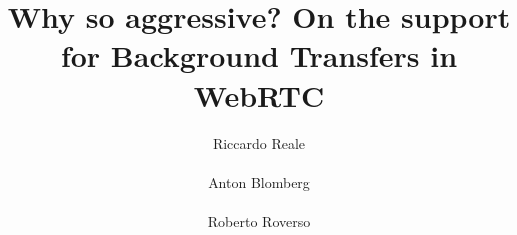\documentclass{sig-alternate}
\begin{document}


\title{Why so aggressive? On the support for Background Transfers in WebRTC}



\author{
\alignauthor
Riccardo Reale\\
      \\
\alignauthor
Anton Blomberg\\
      \\
\alignauthor
Roberto Roverso\\
      \\
}


\newcommand{\mysec}[1]{\vspace*{-0.2cm}\section{#1}}
\newcommand{\mysubsec}[1]{\vspace*{-0.0cm}\subsection{#1}\vspace*{0cm}}
\newcommand{\mysubsubsec}[1]{\vspace*{-0.0cm}\subsubsection{#1}\vspace*{0cm}}
\newcommand{\mypar}[1]{\vspace*{-0cm}\paragraph{#1}\vspace*{0cm}}


\maketitle
\end{document}
